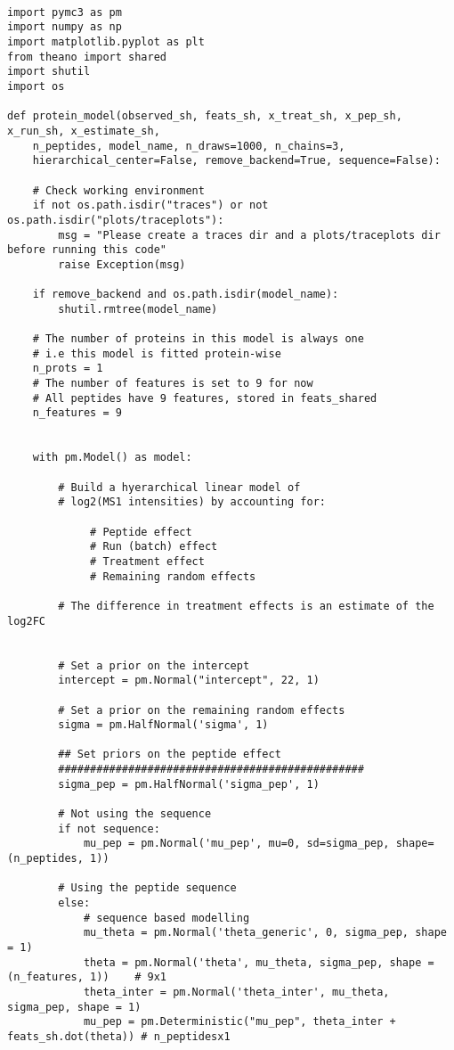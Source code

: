 \documentclass[a4paper]{article}
\begin{document}
\begin{verbatim}

import pymc3 as pm
import numpy as np
import matplotlib.pyplot as plt
from theano import shared
import shutil
import os

def protein_model(observed_sh, feats_sh, x_treat_sh, x_pep_sh, x_run_sh, x_estimate_sh,
    n_peptides, model_name, n_draws=1000, n_chains=3,
    hierarchical_center=False, remove_backend=True, sequence=False):

    # Check working environment  
    if not os.path.isdir("traces") or not os.path.isdir("plots/traceplots"):
        msg = "Please create a traces dir and a plots/traceplots dir before running this code"
        raise Exception(msg)

    if remove_backend and os.path.isdir(model_name):
        shutil.rmtree(model_name)

    # The number of proteins in this model is always one
    # i.e this model is fitted protein-wise
    n_prots = 1
    # The number of features is set to 9 for now
    # All peptides have 9 features, stored in feats_shared
    n_features = 9
    

    with pm.Model() as model:
           
        # Build a hyerarchical linear model of
        # log2(MS1 intensities) by accounting for:

             # Peptide effect
             # Run (batch) effect
             # Treatment effect
             # Remaining random effects

        # The difference in treatment effects is an estimate of the log2FC


        # Set a prior on the intercept
        intercept = pm.Normal("intercept", 22, 1)
        
        # Set a prior on the remaining random effects
        sigma = pm.HalfNormal('sigma', 1)

        ## Set priors on the peptide effect
        ################################################
        sigma_pep = pm.HalfNormal('sigma_pep', 1)

        # Not using the sequence
        if not sequence:
            mu_pep = pm.Normal('mu_pep', mu=0, sd=sigma_pep, shape=(n_peptides, 1))

        # Using the peptide sequence
        else: 
            # sequence based modelling
            mu_theta = pm.Normal('theta_generic', 0, sigma_pep, shape = 1)
            theta = pm.Normal('theta', mu_theta, sigma_pep, shape = (n_features, 1))    # 9x1
            theta_inter = pm.Normal('theta_inter', mu_theta, sigma_pep, shape = 1)
            mu_pep = pm.Deterministic("mu_pep", theta_inter + feats_sh.dot(theta)) # n_peptidesx1



\end{verbatim}
\end{document}
